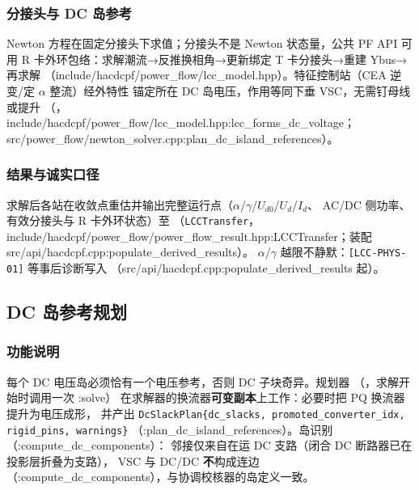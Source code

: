 \subsubsection*{分接头与 DC 岛参考}
Newton 方程在固定分接头下求值；分接头不是 Newton 状态量，公共 PF API 可用
R 卡外环包络：求解潮流→反推换相角→更新绑定 T 卡分接头→重建 Ybus→再求解
（include/hacdcpf/power\_flow/lcc\_model.hpp）。特征控制站（CEA 逆变/定 $\alpha$ 整流）经外特性
锚定所在 DC 岛电压，作用等同下垂 VSC，无需钉母线或提升
（，include/hacdcpf/power\_flow/lcc\_model.hpp:lcc\_forms\_dc\_voltage；
src/power\_flow/newton\_solver.cpp:plan\_dc\_island\_references）。

\subsubsection*{结果与诚实口径}
求解后各站在收敛点重估并输出完整运行点（$\alpha$/$\gamma$/$U_{d0}$/$U_d$/$I_d$、
AC/DC 侧功率、有效分接头与 R 卡外环状态）至 
（\texttt{LCCTransfer}，include/hacdcpf/power\_flow/power\_flow\_result.hpp:LCCTransfer；装配 src/api/hacdcpf.cpp:populate\_derived\_results）。
$\alpha$/$\gamma$ 越限不静默：\texttt{[LCC-PHYS-01]} 等事后诊断写入
（src/api/hacdcpf.cpp:populate\_derived\_results 起）。

\subsection{DC 岛参考规划}\label{sec:hybrid-dcref}

\subsubsection*{功能说明}
每个 DC 电压岛必须恰有一个电压参考，否则 DC 子块奇异。规划器
（，求解开始时调用一次 :solve）
在求解器的换流器\textbf{可变副本}上工作：必要时把 PQ 换流器提升为电压成形，
并产出 \texttt{DcSlackPlan\{dc\_slacks, promoted\_converter\_idx, rigid\_pins, warnings\}}
（:plan\_dc\_island\_references）。岛识别 （:compute\_dc\_components）：
邻接仅来自在运 DC 支路（闭合 DC 断路器已在投影层折叠为支路），
VSC 与 DC/DC \textbf{不}构成连边（:compute\_dc\_components），与协调校核器的岛定义一致。

